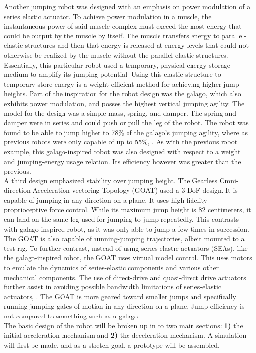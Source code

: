 \indent Another jumping robot was designed with an emphasis on power modulation of a series elastic actuator. To achieve power modulation in a muscle, the instantaneous power of said muscle complex must exceed the most energy that could be output by the muscle by itself. The muscle transfers energy to parallel-elastic structures and then that energy is released at energy levels that could not otherwise be realized by the muscle without the parallel-elastic structures. Essentially, this particular robot used a temporary, physical energy storage medium to amplify its jumping potential. Using this elastic structure to temporary store energy is a weight efficient method for achieving higher jump heights. Part of the inspiration for the robot design was the galago, which also exhibits power modulation, and posses the highest vertical jumping agility. The model for the design was a simple mass, spring, and damper. The spring and damper were in series and could push or pull the leg of the robot. The robot was found to be able to jump higher to 78\% of the galago's jumping agility, where as previous robots were only capable of up to 55\%, \cite{haldane_robotic_2016}. As with the previous robot example, this galago-inspired robot was also designed with respect to a weight and jumping-energy usage relation. Its efficiency however was greater than the previous.\\

\indent A third design emphasized stability over jumping height. The Gearless Omni-direction Acceleration-vectoring Topology (GOAT) used a 3-DoF design. It is capable of jumping in any direction on a plane. It uses high fidelity proprioceptive force control. While its maximum jump height is 82 centimeters, it can land on the same leg used for jumping to jump repeatedly. This contrasts with galago-inspired robot, as it was only able to jump a few times in succession. The GOAT is also capable of running-jumping trajectories, albeit mounted to a test rig. To further contrast, instead of using series-elastic actuators (SEAs), like the galago-inspired robot, the GOAT uses virtual model control. This uses motors to emulate the dynamics of series-elastic components and various other mechanical components. The use of direct-drive and quasi-direct drive actuators further assist in avoiding possible bandwidth limitations of series-elastic actuators, \cite{kalouche_goat:_2017}. The GOAT is more geared toward smaller jumps and specifically running-jumping gates of motion in any direction on a plane. Jump efficiency is not compared to something such as a galago.\\

\indent The basic design of the robot will be broken up in to two main sections: \textbf{1)} the initial acceleration mechanism and \textbf{2)} the deceleration mechanism. A simulation will first be made, and as a stretch-goal, a prototype will be assembled.\\